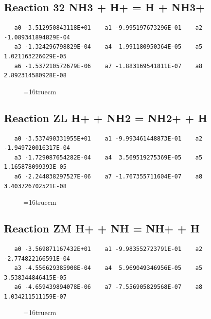 \documentclass[12pt,dvipdfm]{article}
\begin{document}
\subsection{
Reaction 32 NH3 + H+ = H + NH3+}
\begin{small}\begin{verbatim}
   a0 -3.512950843118E+01    a1 -9.995197673296E-01    a2 -1.089341894829E-04
   a3 -1.324296798829E-04    a4  1.991180950364E-05    a5  1.021163226029E-05
   a6 -1.537210572679E-06    a7 -1.883169541811E-07    a8  2.892314580928E-08
   \end{verbatim}\end{small}
\begin{figure}[h!]
\label{n2rates}
\epsfxsize=16truecm
\end{figure}
\newpage

\subsection{
Reaction ZL H+ + NH2 = NH2+ + H}
\begin{small}\begin{verbatim}
   a0 -3.537490331955E+01    a1 -9.993461448873E-01    a2 -1.949720016317E-04
   a3 -1.729087654282E-04    a4  3.569519275369E-05    a5  1.165878099393E-05
   a6 -2.244838297527E-06    a7 -1.767355711604E-07    a8  3.403726702521E-08
   \end{verbatim}\end{small}
\begin{figure}[h!]
\label{n2rates}
\epsfxsize=16truecm
\end{figure}
\newpage

\subsection{
Reaction ZM 	H+ + NH = NH+ + H}
\begin{small}\begin{verbatim}
   a0 -3.569871167432E+01    a1 -9.983552723791E-01    a2 -2.774822166591E-04
   a3 -4.556629385908E-04    a4  5.969049346956E-05    a5  3.538344846415E-05
   a6 -4.659439894078E-06    a7 -7.556905829568E-07    a8  1.034211511159E-07
   \end{verbatim}\end{small}
\begin{figure}[h!]
\label{n2rates}
\epsfxsize=16truecm
\end{figure}
\newpage
\end{document}

